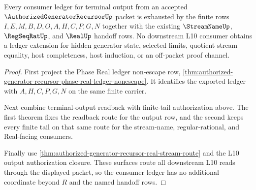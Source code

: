 \begin{theorem}
\label{thm:authorized-generator-recursor-consumer-ledger-exhaustion}
Every consumer ledger for terminal output from an accepted
$\AuthorizedGeneratorRecursorUp$ packet is exhausted by the finite rows
$I,E,M,B,D,O,A,H,C,P,G,N$ together with the existing $\StreamNameUp$,
$\RegSeqRatUp$, and $\RealUp$ handoff rows. No downstream L10 consumer obtains
a ledger extension for hidden generator state, selected limits, quotient
stream equality, host completeness, host induction, or an off-packet proof
channel.
\end{theorem}
\begin{proof}
First project the Phase Real ledger non-escape row,
\autoref{thm:authorized-generator-recursor-phase-real-ledger-nonescape}. It
identifies the exported ledger with $A,H,C,P,G,N$ on the same finite carrier.

Next combine terminal-output readback with finite-tail authorization above.
The first theorem fixes the readback route for the output row, and the second
keeps every finite tail on that same route for the stream-name,
regular-rational, and Real-facing consumers.

Finally use \autoref{thm:authorized-generator-recursor-real-stream-route} and
the L10 output authorization closure. These surfaces route all downstream L10
reads through the displayed packet, so the consumer ledger has no additional
coordinate beyond $R$ and the named handoff rows.
\end{proof}

